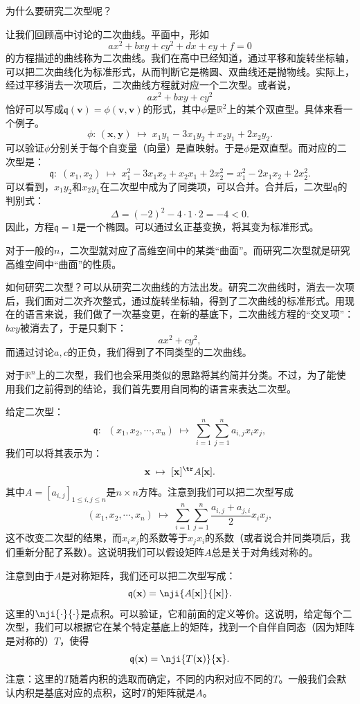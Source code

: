 \documentclass[12pt,UTF8]{ctexbook}
\begin{document}
为什么要研究二次型呢？

让我们回顾高中讨论的二次曲线。平面中，形如
$$ ax^2 + bxy + cy^2 + dx + ey + f = 0 $$
的方程描述的曲线称为二次曲线。我们在高中已经知道，通过平移和旋转坐标轴，可以把二次曲线化为标准形式，从而判断它是椭圆、双曲线还是抛物线。实际上，经过平移消去一次项后，二次曲线方程就对应一个二次型。或者说，
$$ ax^2 + bxy + cy^2 $$
恰好可以写成$\mathfrak{q}(\mathbf{v}) = \phi(\mathbf{v}, \mathbf{v})$的形式，其中$\phi$是$\mathbb{R}^2$上的某个双直型。具体来看一个例子。
$$\phi: \,( \mathbf{x}, \mathbf{y} ) \; \mapsto \; x_1y_1 - 3x_1y_2 + x_2y_1 + 2x_2y_2.
$$
可以验证$\phi$分别关于每个自变量（向量）是直映射。于是$\phi$是双直型。而对应的二次型是：
$$ \mathfrak{q}:\; (x_1, x_2) \; \mapsto \; x_1^2 - 3x_1x_2 + x_2x_1 + 2x_2^2 = x_1^2 - 2x_1x_2 + 2x_2^2.
$$
可以看到，$x_1y_2$和$x_2y_1$在二次型中成为了同类项，可以合并。合并后，二次型$\mathfrak{q}$的判别式：
$$
\Delta = (-2)^2 - 4\cdot 1\cdot 2 = -4 < 0.
$$
因此，方程$\mathfrak{q} = 1$是一个椭圆。可以通过幺正基变换，将其变为标准形式。

对于一般的$n$，二次型就对应了高维空间中的某类“曲面”。而研究二次型就是研究高维空间中“曲面”的性质。

如何研究二次型？可以从研究二次曲线的方法出发。研究二次曲线时，消去一次项后，我们面对二次齐次整式，通过旋转坐标轴，得到了二次曲线的标准形式。用现在的语言来说，我们做了一次基变更，在新的基底下，二次曲线方程的“交叉项”：$bxy$被消去了，于是只剩下：
$$ ax^2 + cy^2,$$
而通过讨论$a,c$的正负，我们得到了不同类型的二次曲线。

对于$\mathbb{R}^n$上的二次型，我们也会采用类似的思路将其约简并分类。不过，为了能使用我们之前得到的结论，我们首先要用自同构的语言来表达二次型。

给定二次型：
$$ \mathfrak{q}:\;\; (x_1, x_2, \cdots, x_n) \; \mapsto \; \sum_{i=1}^n \sum_{j=1}^n a_{i,j} x_i x_j, $$
我们可以将其表示为：
$$ \mathbf{x} \; \mapsto \; [\mathbf{x}]^{\tr} A [\mathbf{x}]. $$
其中$A = [a_{i,j}]_{1\leqslant i,j\leqslant n}$是$n\times n$方阵。注意到我们可以把二次型写成
$$ (x_1, x_2, \cdots, x_n) \; \mapsto \; \sum_{i=1}^n \sum_{j=1}^n \frac{a_{i,j} + a_{j,i}}{2} x_i x_j, $$
这不改变二次型的结果，而$x_i x_j$的系数等于$x_j x_i$的系数（或者说合并同类项后，我们重新分配了系数）。这说明我们可以假设矩阵$A$总是关于对角线对称的。

注意到由于$A$是对称矩阵，我们还可以把二次型写成：
$$ \mathfrak{q}(\mathbf{x}) =  \nji{A[\mathbf{x}]}{[\mathbf{x}]}. $$
这里的$\nji{\cdot}{\cdot}$是点积。可以验证，它和前面的定义等价。这说明，给定每个二次型，我们可以根据它在某个特定基底上的矩阵，找到一个自伴自同态（因为矩阵是对称的）$T$，使得
$$ \mathfrak{q}(\mathbf{x}) = \nji{T(\mathbf{x})}{\mathbf{x}}. $$
注意：这里的$T$随着内积的选取而确定，不同的内积对应不同的$T$。一般我们会默认内积是基底对应的点积，这时$T$的矩阵就是$A$。
\end{document}

